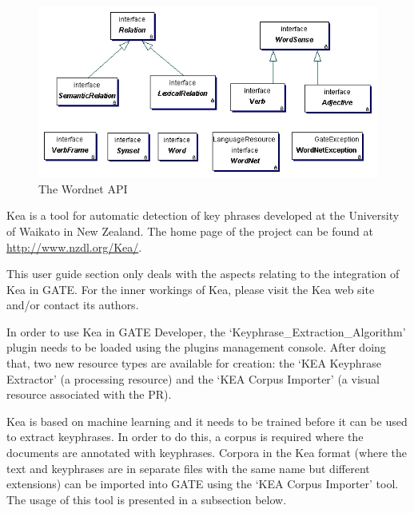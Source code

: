 \begin{figure}[!htb]
\begin{center}
\includegraphics[scale=1]{wordnet4.png}
\caption{The Wordnet API}
\label{fig:wordnet4}
\end{center}
\end{figure}
 


Kea is a tool for automatic detection of key phrases developed at
the University of Waikato in New Zealand. The home page of the project can be
found at \url{http://www.nzdl.org/Kea/}.

This user guide section only deals with the aspects relating to the integration
of Kea in GATE. For the inner workings of Kea, please visit the Kea web site
and/or contact its authors.

In order to use Kea in GATE Developer, the `Keyphrase\_Extraction\_Algorithm'
plugin needs to be loaded using the plugins management console. After doing that,
two new resource types are available for creation: the `KEA Keyphrase
Extractor' (a processing resource) and the `KEA Corpus Importer' (a visual
resource associated with the PR).


Kea is based on machine learning and it needs to be trained before it can be
used to extract keyphrases. In order to do this, a corpus is required where the
documents are annotated with keyphrases. Corpora in the Kea format (where the
text and keyphrases are in separate files with the same name but different
extensions) can be imported into GATE using the `KEA Corpus Importer' tool.
The usage of this tool is presented in a subsection below.

